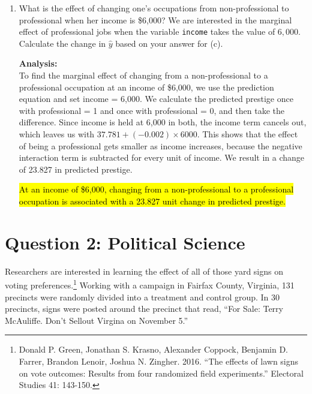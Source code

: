 \documentclass[12pt,letterpaper]{article}
\begin{document}
\begin{enumerate}
	\hl{For professional occupations, a \$1,000 increase in income is associated with a 0.845 unit increase in predicted prestige. }
	
	\item [(g)]
	What is the effect of changing one's occupations from non-professional to professional when her income is \$6,000? We are interested in the marginal effect of professional jobs when the variable \texttt{income} takes the value of $6,000$. Calculate the change in $\hat{y}$ based on your answer for (c).
	
	
	
	
	\textbf{Analysis:}\\
	To find the marginal effect of changing from a non-professional to a professional occupation at an income of \$6,000, we use the prediction equation and set income = 6,000. We calculate the predicted prestige once with professional = 1 and once with professional = 0, and then take the difference. Since income is held at 6,000 in both, the income term cancels out, which leaves us with $37.781 + (-0.002) \times 6000$. This shows that the effect of being a professional gets smaller as income increases, because the negative interaction term is subtracted for every unit of income. We result in a change of 23.827 in predicted prestige.
	
	\hl{At an income of \$6,000, changing from a non-professional to a professional occupation is associated with a 23.827 unit change in predicted prestige.}
	
	
\end{enumerate}

\newpage

\section*{Question 2: Political Science}
\vspace{.25cm}
\noindent 	Researchers are interested in learning the effect of all of those yard signs on voting preferences.\footnote{Donald P. Green, Jonathan	S. Krasno, Alexander Coppock, Benjamin D. Farrer,	Brandon Lenoir, Joshua N. Zingher. 2016. ``The effects of lawn signs on vote outcomes: Results from four randomized field experiments.'' Electoral Studies 41: 143-150. } Working with a campaign in Fairfax County, Virginia, 131 precincts were randomly divided into a treatment and control group. In 30 precincts, signs were posted around the precinct that read, ``For Sale: Terry McAuliffe. Don't Sellout Virgina on November 5.'' \\
\end{document}
